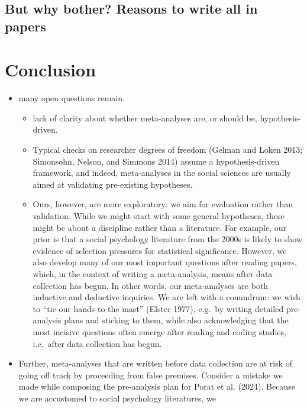 \documentclass{article}
\begin{document}
\subsection{But why bother? Reasons to write all in
papers}\label{but-why-bother-reasons-to-write-all-in-papers}

\section{Conclusion}\label{conclusion}

\begin{itemize}
\item
  many open questions remain.

  \begin{itemize}
  \item
    lack of clarity about whether meta-analyses are, or should be,
    hypothesis-driven.
  \item
    Typical checks on researcher degrees of freedom (Gelman and Loken
    2013; Simonsohn, Nelson, and Simmons 2014) assume a
    hypothesis-driven framework, and indeed, meta-analyses in the social
    sciences are usually aimed at validating pre-existing hypotheses.
  \item
    Ours, however, are more exploratory: we aim for evaluation rather
    than validation. While we might start with some general hypotheses,
    these might be about a discipline rather than a literature. For
    example, our prior is that a social psychology literature from the
    2000s is likely to show evidence of selection pressures for
    statistical significance. However, we also develop many of our most
    important questions after reading papers, which, in the context of
    writing a meta-analysis, means after data collection has begun. In
    other words, our meta-analyses are both inductive and deductive
    inquiries. We are left with a conundrum: we wish to ``tie our hands
    to the mast'' (Elster 1977), e.g.~by writing detailed pre-analysis
    plans and sticking to them, while also acknowledging that the most
    incisive questions often emerge after reading and coding studies,
    i.e.~after data collection has begun.
  \end{itemize}
\item
  Further, meta-analyses that are written before data collection are at
  risk of going off track by proceeding from false premises. Consider a
  mistake we made while composing the pre-analysis plan for Porat et al.
  (2024). Because we are accustomed to social psychology literatures, we

\end{itemize}
\end{document}
